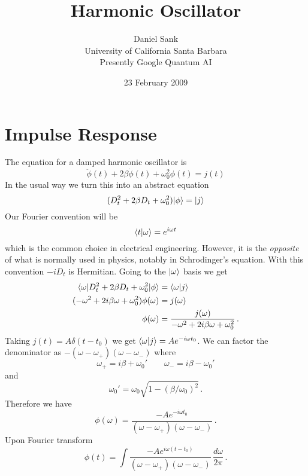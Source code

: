 \documentclass{article}
\title{Harmonic Oscillator}
\author{Daniel Sank \\ \small{University of California Santa Barbara} \\ \small{Presently Google Quantum AI}}
\date{23 February 2009}
\begin{document}
\maketitle

\section{Impulse Response}

The equation for a damped harmonic oscillator is \begin{equation}
\ddot{\phi}(t)+2\beta\dot{\phi}(t)+\omega_{0}^{2}\phi(t)=j(t) \end{equation}
In the usual way we turn this into an abstract equation \begin{equation}
(D_{t}^{2}+2\beta D_{t}+\omega_{0}^{2})| \phi \rangle=| j \rangle \end{equation}
Our Fourier convention will be
\begin{equation}
\langle t|\omega\rangle=e^{i\omega t}
\end{equation}
which is the common choice in electrical engineering.
However, it is the \emph{opposite} of what is normally used in physics, notably in Schrodinger's equation.
With this convention $-iD_t$ is Hermitian.
Going to the $| \omega \rangle$ basis we get
\begin{align}
\langle \omega | D_t^2 + 2\beta D_t + \omega_0^2 | \phi \rangle &= \langle \omega|j\rangle \\
(-\omega^{2} + 2 i \beta\omega + \omega_{0}^{2}) \phi(\omega) & = j(\omega)\\
\phi(\omega) & = \frac{j(\omega)}{-\omega^{2} + 2 i \beta \omega + \omega_{0}^{2}} \, .
\end{align}
Taking $j(t)=A\delta(t-t_{0})$ we get $\langle \omega|j\rangle = A e^{-i \omega t_{0}}$.
We can factor the denominator as $-(\omega-\omega_{+})(\omega-\omega_{-})$
where
\begin{equation}
\omega_{+} = i \beta + \omega_0' \qquad \omega_{-} = i \beta - \omega_0' \label{eq:omega_plus_minus}
\end{equation}
and
\begin{equation}
\omega_0' = \omega_0 \sqrt{ 1 - \left( \beta / \omega_0 \right) ^2 } \, .
\end{equation}
Therefore we have \begin{equation}
\phi(\omega) = \frac{-A e^{-i \omega t_0}}{(\omega - \omega_{+})(\omega-\omega_{-})} \, .
\end{equation}
Upon Fourier transform
\begin{equation}
\phi(t) = 
\int\frac{-Ae^{i \omega(t - t_0)}}{(\omega-\omega_{+})(\omega-\omega_{-})} \,
\frac{d\omega}{2\pi} \, .
\end{equation}
\end{document}

